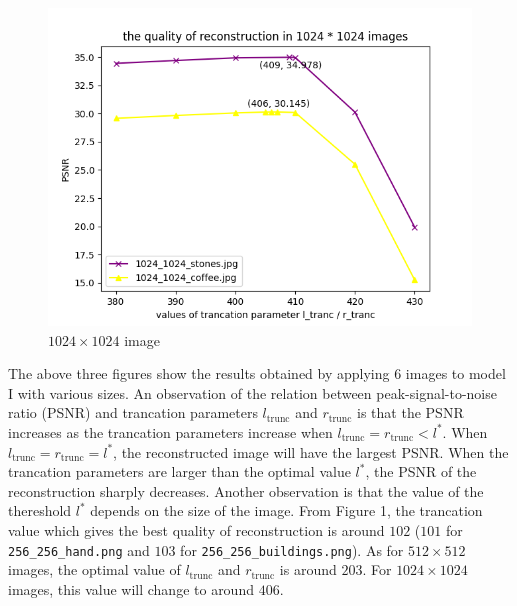 \begin{figure}[H]
\begin{minipage}[t]{0.3\linewidth}
    \includegraphics[width=\textwidth]{quality_1024.png}
    \caption{$1024 \times 1024$ image}
    \label{Fig.3}
    \end{minipage}
\end{figure}
The above three figures show the results obtained by applying 6 images to model I with various sizes. An observation of the relation between peak-signal-to-noise ratio (PSNR) and trancation parameters $l_{\text{trunc}}$ and $r_{\text{trunc}}$ is that the PSNR increases as the trancation parameters increase when $l_{\text{trunc}} = r_{\text{trunc}} < l^*$. When $l_{\text{trunc}} = r_{\text{trunc}} = l^*$, the reconstructed image will have the largest PSNR.  When the trancation parameters are larger than the optimal value $l^*$, the PSNR of the reconstruction sharply decreases. Another observation is that the value of the thereshold $l^*$ depends on the size of the image. From Figure 1, the trancation value which gives the best quality of reconstruction is around $102$ ($101$ for \lstinline{256_256_hand.png} and $103$ for \lstinline{256_256_buildings.png}). As for $512 \times 512$ images, the optimal value of $l_{\text{trunc}}$ and $r_{\text{trunc}}$ is around $203$. For $1024 \times 1024$ images, this value will change to around $406$.

